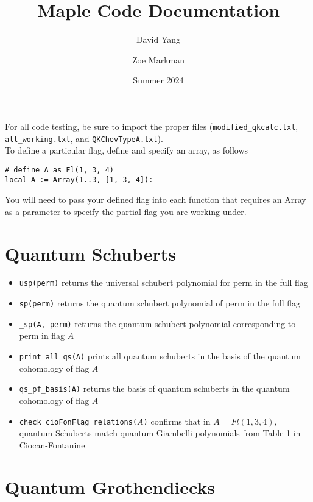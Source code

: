 \documentclass[11pt]{article}
\begin{document}
\title{\textbf{Maple Code Documentation}}
\author{David Yang \and Zoe Markman}
\date{Summer 2024}

\maketitle

For all code testing, be sure to import the proper files (\texttt{modified\_qkcalc.txt}, \texttt{all\_working.txt}, and \texttt{QKChevTypeA.txt}). \\

To define a particular flag, define and specify an array, as follows
\begin{lstlisting}[language = Maple]
# define A as Fl(1, 3, 4)
local A := Array(1..3, [1, 3, 4]):
\end{lstlisting}

You will need to pass your defined flag into each function that requires an Array as a parameter to specify the partial flag you are working under.

\section{Quantum Schuberts}
\begin{itemize}
    \item \texttt{usp(perm)} returns the universal schubert polynomial for perm in the full flag
    \item \texttt{sp(perm)} returns the quantum schubert polynomial of perm in the full flag
    \item \texttt{\_sp(A, perm)} returns the quantum schubert polynomial corresponding to perm in flag $A$
    \item \texttt{print\_all\_qs(A)} prints all quantum schuberts in the basis of the quantum cohomology of flag $A$
    \item \texttt{qs\_pf\_basis(A)} returns the basis of quantum schuberts in the quantum cohomology of flag $A$
    \item \texttt{check\_cioFonFlag\_relations($A$)} confirms that in $A = Fl(1, 3, 4)$, quantum Schuberts match quantum Giambelli polynomials from Table 1 in Ciocan-Fontanine
    
\end{itemize}
\section{Quantum Grothendiecks}
\end{document}
